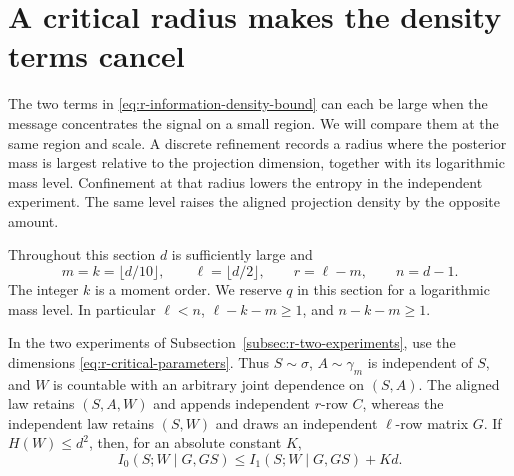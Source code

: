 \section{A critical radius makes the density terms cancel}
\label{sec:r-critical-radius}

The two terms in \eqref{eq:r-information-density-bound} can each
be large when the message concentrates the signal on a small region.
We will compare them at the same region and scale.  A discrete
refinement records a radius where the posterior mass is largest
relative to the projection dimension, together with its logarithmic
mass level.  Confinement at that radius lowers the entropy in the
independent experiment.  The same level raises the aligned projection
density by the opposite amount.

Throughout this section \(d\) is sufficiently large and
\begin{equation}\label{eq:r-critical-parameters}
 m=k=\lfloor d/10\rfloor,\qquad
 \ell=\lfloor d/2\rfloor,\qquad r=\ell-m,\qquad n=d-1.
\end{equation}
The integer \(k\) is a moment order.  We reserve \(q\) in this
section for a logarithmic mass level.  In particular
\(\ell<n\), \(\ell-k-m\ge1\), and \(n-k-m\ge1\).

\begin{theorem}\label{thm:r-critical-comparison}
In the two experiments of Subsection~\ref{subsec:r-two-experiments},
use the dimensions \eqref{eq:r-critical-parameters}.  Thus
\(S\sim\sigma\), \(A\sim\gamma_m\) is independent of \(S\), and
\(W\) is countable with an arbitrary joint dependence on \((S,A)\).
The aligned law retains \((S,A,W)\) and appends independent
\(r\)-row \(C\), whereas the independent law retains \((S,W)\)
and draws an independent \(\ell\)-row matrix \(G\).
If \(H(W)\le d^2\), then, for an absolute constant \(K\),
\begin{equation}\label{eq:r-critical-comparison}
 I_0(S;W\mid G,GS)\le I_1(S;W\mid G,GS)+Kd.
\end{equation}
\end{theorem}

